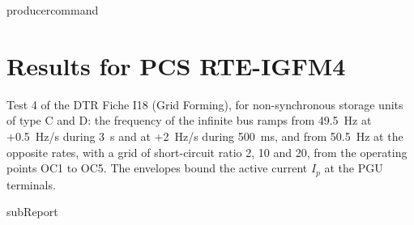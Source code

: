 {{ producercommand }}



    \section{Results for PCS RTE-IGFM4}

    Test 4 of the DTR Fiche I18 (Grid Forming), for non-synchronous storage units of type C
    and D: the frequency of the infinite bus ramps from 49.5~Hz at
    +0.5~Hz/s during 3~s and at +2~Hz/s during 500~ms, and from 50.5~Hz at the opposite rates,
    with a grid of short-circuit ratio 2, 10 and 20, from the operating points OC1 to OC5. The
    envelopes bound the active current \(I_p\) at the PGU terminals.

    {{subReport}}
    \newpage
